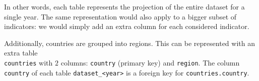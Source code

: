 In other words, each table represents the projection of the entire dataset for a single year.
The same representation would also apply to a bigger subset of indicators: we would simply add an extra column for each considered indicator.

Additionally, countries are grouped into regions.
This can be represented with an extra table \\ \texttt{countries} with $2$ columns: \texttt{country} (primary key) and \texttt{region}.
The column \texttt{country} of each table \texttt{dataset\_<year>} is a foreign key for \texttt{countries.country}.
